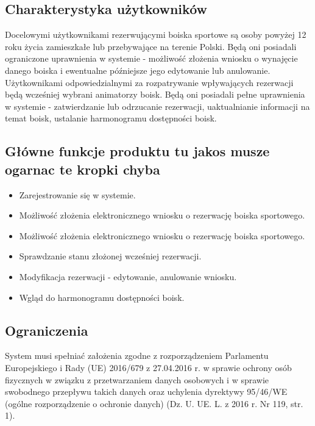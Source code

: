 \documentclass[a4paper, portrait,11pt]{article}
\begin{document}
\subsection {Charakterystyka użytkowników}
Docelowymi użytkownikami rezerwującymi boiska sportowe są osoby powyżej 12 roku życia zamieszkałe lub przebywające na terenie Polski. Będą oni posiadali ograniczone uprawnienia w systemie - możliwość złożenia wniosku o wynajęcie danego boiska i ewentualne późniejsze jego edytowanie lub anulowanie.
\\\indent
Użytkownikami odpowiedzialnymi za rozpatrywanie wpływających rezerwacji będą wcześniej wybrani animatorzy boisk. Będą oni posiadali pełne uprawnienia w systemie - zatwierdzanie lub odrzucanie rezerwacji, uaktualnianie informacji na temat boisk, ustalanie harmonogramu dostępności boisk.

\subsection {Główne funkcje produktu tu jakos musze ogarnac te kropki chyba}
\begin{itemize}
	\item Zarejestrowanie się w systemie.
	\item Możliwość złożenia elektronicznego wniosku o rezerwację boiska sportowego.
	\item Możliwość złożenia elektronicznego wniosku o rezerwację boiska sportowego.
	\item Sprawdzanie stanu złożonej wcześniej rezerwacji.
	\item Modyfikacja rezerwacji - edytowanie, anulowanie wniosku.
	\item Wgląd do harmonogramu dostępności boisk.
\end{itemize} 

\subsection {Ograniczenia}
System musi spełniać założenia zgodne z rozporządzeniem Parlamentu Europejskiego i Rady (UE) 2016/679 z 27.04.2016 r. w sprawie ochrony osób fizycznych w związku z przetwarzaniem danych osobowych i w sprawie swobodnego przepływu takich danych oraz uchylenia dyrektywy 95/46/WE (ogólne rozporządzenie o ochronie danych) (Dz. U. UE. L. z 2016 r. Nr 119, str. 1).
\end{document}
